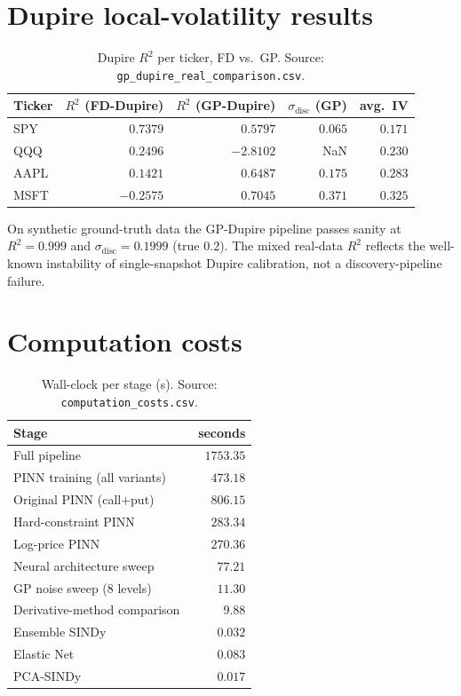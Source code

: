 \documentclass[10pt]{article}
\begin{document}
\section{Dupire local-volatility results}\label{app:dupire}
\begin{table}[h]
\centering\footnotesize
\caption{Dupire $R^2$ per ticker, FD vs.\ GP. Source: \texttt{gp\_dupire\_real\_comparison.csv}.}
\label{tab:dupire}
\begin{tabular}{lrrrr}
\toprule
Ticker & $R^2$ (FD-Dupire) & $R^2$ (GP-Dupire) & $\sigma_{\text{disc}}$ (GP) & avg.\ IV \\
\midrule
SPY  & $\phantom{-}0.7379$ & $\phantom{-}0.5797$ & $0.065$ & $0.171$ \\
QQQ  & $\phantom{-}0.2496$ & $-2.8102$           & NaN     & $0.230$ \\
AAPL & $\phantom{-}0.1421$ & $\phantom{-}0.6487$ & $0.175$ & $0.283$ \\
MSFT & $-0.2575$           & $\phantom{-}0.7045$ & $0.371$ & $0.325$ \\
\bottomrule
\end{tabular}
\end{table}
On synthetic ground-truth data the GP-Dupire pipeline passes sanity at $R^2{=}0.999$ and $\sigma_{\text{disc}}{=}0.1999$ (true $0.2$). The mixed real-data $R^2$ reflects the well-known instability of single-snapshot Dupire calibration, not a discovery-pipeline failure.

\section{Computation costs}\label{app:cost}
\begin{table}[h]
\centering\footnotesize
\caption{Wall-clock per stage (s). Source: \texttt{computation\_costs.csv}.}
\label{tab:cost}
\begin{tabular}{lr}
\toprule
Stage & seconds \\
\midrule
Full pipeline                       & $1753.35$ \\
PINN training (all variants)        & $\phantom{0}473.18$ \\
\quad Original PINN (call+put)      & $\phantom{0}806.15$ \\
\quad Hard-constraint PINN          & $\phantom{0}283.34$ \\
\quad Log-price PINN                & $\phantom{0}270.36$ \\
Neural architecture sweep           & $\phantom{00}77.21$ \\
GP noise sweep (8 levels)           & $\phantom{00}11.30$ \\
Derivative-method comparison        & $\phantom{000}9.88$ \\
Ensemble SINDy                      & $\phantom{0000}0.032$ \\
Elastic Net                         & $\phantom{0000}0.083$ \\
PCA-SINDy                           & $\phantom{0000}0.017$ \\
\bottomrule
\end{tabular}
\end{table}
\end{document}
